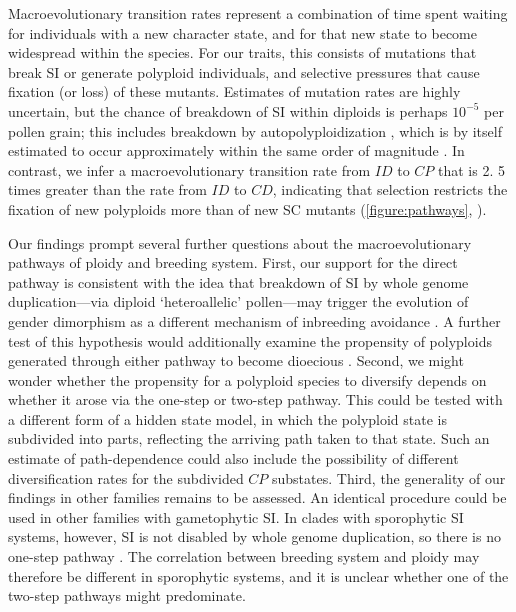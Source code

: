 Macroevolutionary transition rates represent a combination of time spent waiting for individuals with a new character state, and for that new state to become widespread within the species.
For our traits, this consists of mutations that break SI or generate polyploid individuals, and selective pressures that cause fixation (or loss) of these mutants.
Estimates of mutation rates are highly uncertain, but the chance of breakdown of SI within diploids is perhaps $10^{-5}$ per pollen grain; this includes breakdown by autopolyploidization \citep{lewis1979}, which is by itself estimated to occur approximately within the same order of magnitude \citep{ramsey_1998}. 
In contrast, we infer a macroevolutionary transition rate from $ID$ to $CP$ that is 2. 5 times greater than the rate from $ID$ to $CD$, indicating that selection restricts the fixation of new polyploids more than of new SC mutants  (\cref{figure:pathways}, \citealt{robertson_2011}). 

Our findings prompt several further questions about the macroevolutionary pathways of ploidy and breeding system.
%
First, our support for the direct pathway is consistent with the idea that breakdown of SI by whole genome duplication---via diploid `heteroallelic' pollen---may trigger the evolution of gender dimorphism as a different mechanism of inbreeding avoidance \citep{miller_2000}.
A further test of this hypothesis would additionally examine the propensity of polyploids generated through either pathway to become dioecious \citep{robertson_2011}.
Second, we might wonder whether the propensity for a polyploid species to diversify depends on whether it arose via the one-step or two-step pathway.
This could be tested with a different form of a hidden state model, in which the polyploid state is subdivided into parts, reflecting the arriving path taken to that state. %
Such an estimate of path-dependence could also include the possibility of different diversification rates for the subdivided $CP$ substates.
Third, the generality of our findings in other families remains to be assessed.
An identical procedure could be used in other families with gametophytic SI.
In clades with sporophytic SI systems, however, SI is not disabled by whole genome duplication, so there is no one-step pathway \citep{miller_2000,mable_2004}.
The correlation between breeding system and ploidy may therefore be different in sporophytic systems, and it is unclear whether one of the two-step pathways might predominate.

